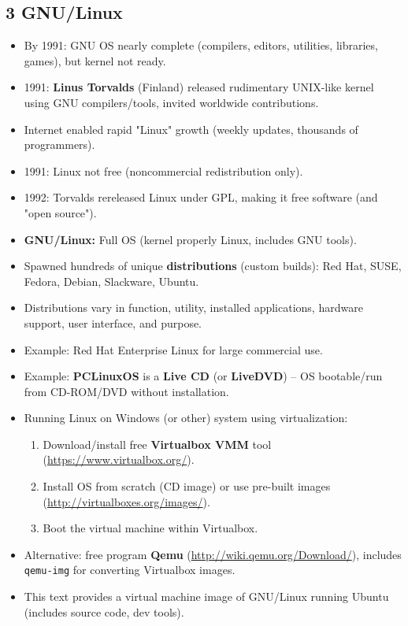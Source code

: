 \documentclass{article}
\begin{document}
\subsection*{3 GNU/Linux}
\begin{itemize}
    \item By 1991: GNU OS nearly complete (compilers, editors, utilities, libraries, games), but kernel not ready.
    \item 1991: \textbf{Linus Torvalds} (Finland) released rudimentary UNIX-like kernel using GNU compilers/tools, invited worldwide contributions.
    \item Internet enabled rapid "Linux" growth (weekly updates, thousands of programmers).
    \item 1991: Linux not free (noncommercial redistribution only).
    \item 1992: Torvalds rereleased Linux under GPL, making it free software (and "open source").
    \item \textbf{GNU/Linux:} Full OS (kernel properly Linux, includes GNU tools).
    \item Spawned hundreds of unique \textbf{distributions} (custom builds): Red Hat, SUSE, Fedora, Debian, Slackware, Ubuntu.
    \item Distributions vary in function, utility, installed applications, hardware support, user interface, and purpose.
    \item Example: Red Hat Enterprise Linux for large commercial use.
    \item Example: \textbf{PCLinuxOS} is a \textbf{Live CD} (or \textbf{LiveDVD}) -- OS bootable/run from CD-ROM/DVD without installation.
    \item Running Linux on Windows (or other) system using virtualization:
    \begin{enumerate}
        \item Download/install free \textbf{Virtualbox VMM} tool (\url{https://www.virtualbox.org/}).
        \item Install OS from scratch (CD image) or use pre-built images (\url{http://virtualboxes.org/images/}).
        \item Boot the virtual machine within Virtualbox.
    \end{enumerate}
    \item Alternative: free program \textbf{Qemu} (\url{http://wiki.qemu.org/Download/}), includes \texttt{qemu-img} for converting Virtualbox images.
    \item This text provides a virtual machine image of GNU/Linux running Ubuntu (includes source code, dev tools).
\end{itemize}
\end{document}
